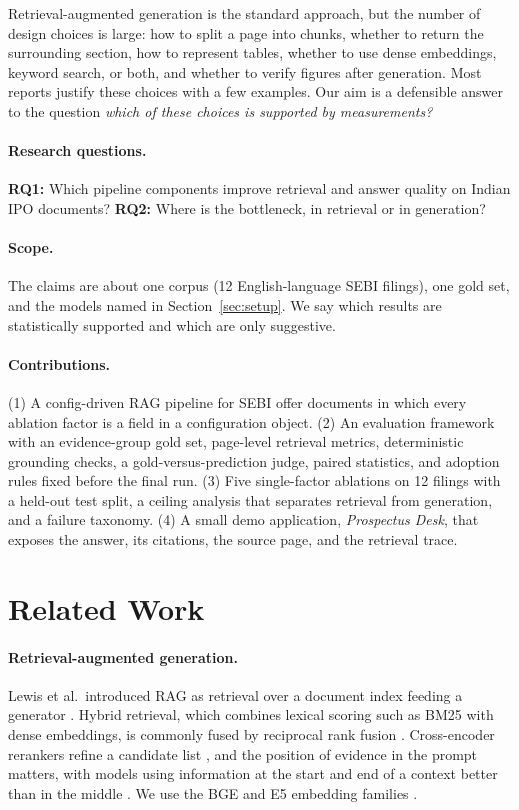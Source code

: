 \documentclass[11pt,a4paper]{article}
\begin{document}
Retrieval-augmented generation is the standard approach, but the number of design choices is large: how to split a page into chunks, whether to return the surrounding section, how to represent tables, whether to use dense embeddings, keyword search, or both, and whether to verify figures after generation. Most reports justify these choices with a few examples. Our aim is a defensible answer to the question \emph{which of these choices is supported by measurements?}

\paragraph{Research questions.}
\textbf{RQ1:} Which pipeline components improve retrieval and answer quality on Indian IPO documents? \textbf{RQ2:} Where is the bottleneck, in retrieval or in generation?

\paragraph{Scope.} The claims are about one corpus (12 English-language SEBI filings), one gold set, and the models named in Section~\ref{sec:setup}. We say which results are statistically supported and which are only suggestive.

\paragraph{Contributions.}
(1) A config-driven RAG pipeline for SEBI offer documents in which every ablation factor is a field in a configuration object. (2) An evaluation framework with an evidence-group gold set, page-level retrieval metrics, deterministic grounding checks, a gold-versus-prediction judge, paired statistics, and adoption rules fixed before the final run. (3) Five single-factor ablations on 12 filings with a held-out test split, a ceiling analysis that separates retrieval from generation, and a failure taxonomy. (4) A small demo application, \emph{Prospectus Desk}, that exposes the answer, its citations, the source page, and the retrieval trace.

\section{Related Work}
\paragraph{Retrieval-augmented generation.}
Lewis et al.\ introduced RAG as retrieval over a document index feeding a generator \cite{lewis2020rag}. Hybrid retrieval, which combines lexical scoring such as BM25 \cite{robertson2009bm25} with dense embeddings, is commonly fused by reciprocal rank fusion \cite{cormack2009rrf}. Cross-encoder rerankers refine a candidate list \cite{nogueira2019rerank}, and the position of evidence in the prompt matters, with models using information at the start and end of a context better than in the middle \cite{liu2023lost}. We use the BGE and E5 embedding families \cite{xiao2023bge,wang2022e5}.
\end{document}
